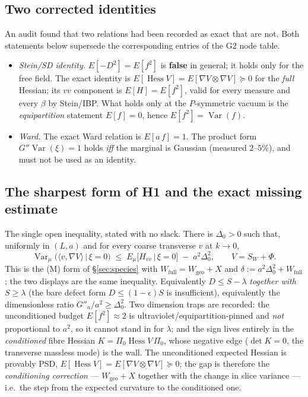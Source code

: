 \subsection{Two corrected identities}
An audit found that two relations had been recorded as exact that are not. Both
statements below supersede the corresponding entries of the G2 node table.
\begin{itemize}
\item \LT{} \emph{Stein/SD identity.} $E[-D^{2}]=E[f^{2}]$ is \textbf{false} in
  general; it holds only for the free field. The exact identity is
  $E[\operatorname{Hess}V]=E[\nabla V\otimes\nabla V]\succeq0$ for the \emph{full}
  Hessian; its $vv$ component is $E[H]=E[f^{2}]$, valid for every measure and
  every $\beta$ by Stein/IBP. What holds only at the $P$-symmetric vacuum is the
  \emph{equipartition} statement $E[f]=0$, hence $E[f^{2}]=\operatorname{Var}(f)$.
\item \LT{} \emph{Ward.} The exact Ward relation is $E[a\,f]=1$. The product form
  $G''\operatorname{Var}(\xi)=1$ holds \emph{iff} the marginal is Gaussian (measured
  $2$--$5\%$), and must not be used as an identity.
\end{itemize}

\subsection{The sharpest form of H1 and the exact missing estimate}
\label{app:sharp}
\LM{} The single open inequality, stated with no slack. There is $\Delta_0>0$
such that, uniformly in $(L,a)$ and for every coarse transverse $v$ at $k\to0$,
\[
  \operatorname{Var}_\mu\!\big(\langle v,\nabla V\rangle\,\big|\,\xi=0\big)
  \;\le\;
  E_\mu\!\big[H_{vv}\,\big|\,\xi=0\big]\;-\;a^{2}\Delta_0^{2},
\qquad V=S_W+\Phi .
\]
This is the (M) form of \S\ref{sec:species} with $W_{\mathrm{full}}=W_{\mathrm{geo}}+X$ and
$\delta:=a^{2}\Delta_0^{2}+W_{\mathrm{full}}$; the two displays are the same inequality.
Equivalently $D\le S-\lambda$ \emph{together with} $S\ge\lambda$ (the bare defect
form $D\le(1-\epsilon)S$ is insufficient), equivalently the dimensionless ratio
$G''_a/a^{2}\ge\Delta_0^{2}$. Two dimension traps are recorded: the unconditioned
budget $E[f^{2}]\approx2$ is ultraviolet/equipartition-pinned and \emph{not}
proportional to $a^{2}$, so it cannot stand in for $\lambda$; and the sign lives
entirely in the \emph{conditioned} fibre Hessian
$K=\Pi_0\operatorname{Hess}V\,\Pi_0$, whose negative edge ($\det K=0$, the
transverse massless mode) is the wall. The unconditioned expected Hessian is
provably PSD, $E[\operatorname{Hess}V]=E[\nabla V\otimes\nabla V]\succeq0$; the
gap is therefore the \emph{conditioning correction} --- $W_{\mathrm{geo}}+X$
together with the change in slice variance --- i.e.\ the step from the expected
curvature to the conditioned one.

